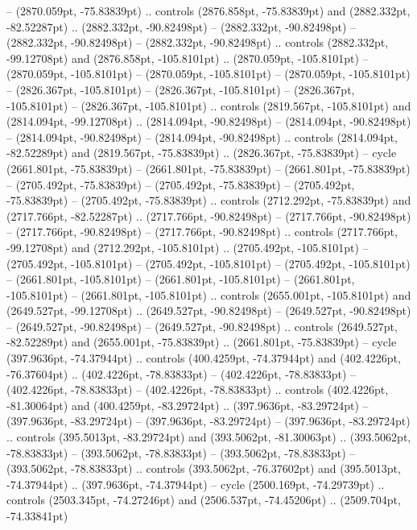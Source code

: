  -- (2870.059pt, -75.83839pt) .. controls (2876.858pt, -75.83839pt) and (2882.332pt, -82.52287pt) .. (2882.332pt, -90.82498pt)
 -- (2882.332pt, -90.82498pt)
 -- (2882.332pt, -90.82498pt)
 -- (2882.332pt, -90.82498pt) .. controls (2882.332pt, -99.12708pt) and (2876.858pt, -105.8101pt) .. (2870.059pt, -105.8101pt)
 -- (2870.059pt, -105.8101pt)
 -- (2870.059pt, -105.8101pt)
 -- (2870.059pt, -105.8101pt)
 -- (2826.367pt, -105.8101pt)
 -- (2826.367pt, -105.8101pt)
 -- (2826.367pt, -105.8101pt)
 -- (2826.367pt, -105.8101pt) .. controls (2819.567pt, -105.8101pt) and (2814.094pt, -99.12708pt) .. (2814.094pt, -90.82498pt)
 -- (2814.094pt, -90.82498pt)
 -- (2814.094pt, -90.82498pt)
 -- (2814.094pt, -90.82498pt) .. controls (2814.094pt, -82.52289pt) and (2819.567pt, -75.83839pt) .. (2826.367pt, -75.83839pt) -- cycle
(2661.801pt, -75.83839pt) -- (2661.801pt, -75.83839pt)
 -- (2661.801pt, -75.83839pt)
 -- (2705.492pt, -75.83839pt)
 -- (2705.492pt, -75.83839pt)
 -- (2705.492pt, -75.83839pt)
 -- (2705.492pt, -75.83839pt) .. controls (2712.292pt, -75.83839pt) and (2717.766pt, -82.52287pt) .. (2717.766pt, -90.82498pt)
 -- (2717.766pt, -90.82498pt)
 -- (2717.766pt, -90.82498pt)
 -- (2717.766pt, -90.82498pt) .. controls (2717.766pt, -99.12708pt) and (2712.292pt, -105.8101pt) .. (2705.492pt, -105.8101pt)
 -- (2705.492pt, -105.8101pt)
 -- (2705.492pt, -105.8101pt)
 -- (2705.492pt, -105.8101pt)
 -- (2661.801pt, -105.8101pt)
 -- (2661.801pt, -105.8101pt)
 -- (2661.801pt, -105.8101pt)
 -- (2661.801pt, -105.8101pt) .. controls (2655.001pt, -105.8101pt) and (2649.527pt, -99.12708pt) .. (2649.527pt, -90.82498pt)
 -- (2649.527pt, -90.82498pt)
 -- (2649.527pt, -90.82498pt)
 -- (2649.527pt, -90.82498pt) .. controls (2649.527pt, -82.52289pt) and (2655.001pt, -75.83839pt) .. (2661.801pt, -75.83839pt) -- cycle
(397.9636pt, -74.37944pt) .. controls (400.4259pt, -74.37944pt) and (402.4226pt, -76.37604pt) .. (402.4226pt, -78.83833pt)
 -- (402.4226pt, -78.83833pt)
 -- (402.4226pt, -78.83833pt)
 -- (402.4226pt, -78.83833pt) .. controls (402.4226pt, -81.30064pt) and (400.4259pt, -83.29724pt) .. (397.9636pt, -83.29724pt)
 -- (397.9636pt, -83.29724pt)
 -- (397.9636pt, -83.29724pt)
 -- (397.9636pt, -83.29724pt) .. controls (395.5013pt, -83.29724pt) and (393.5062pt, -81.30063pt) .. (393.5062pt, -78.83833pt)
 -- (393.5062pt, -78.83833pt)
 -- (393.5062pt, -78.83833pt)
 -- (393.5062pt, -78.83833pt) .. controls (393.5062pt, -76.37602pt) and (395.5013pt, -74.37944pt) .. (397.9636pt, -74.37944pt) -- cycle
(2500.169pt, -74.29739pt) .. controls (2503.345pt, -74.27246pt) and (2506.537pt, -74.45206pt) .. (2509.704pt, -74.33841pt)
